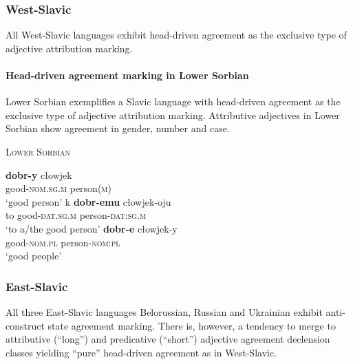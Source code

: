 \subsubsection{West-Slavic}
All West-Slavic languages exhibit head-driven agreement as the exclusive type of adjective attribution marking.
\paragraph{Head-driven agreement marking in Lower Sorbian}
Lower Sorbian exemplifies a Slavic language with head-driven agreement as the exclusive type of adjective attribution marking. Attributive adjectives in Lower Sorbian show agreement in gender, number and case. 

\begin{exe}
\ex \textsc{Lower Sorbian} \citep{janas1976}
\begin{xlist}
\ex
\gll	\textbf{dobr-y} cłowjek\\
	good-\textsc{nom.sg.m} person(\textsc{m})\\
\glt	‘good person’
\ex
\gll	k \textbf{dobr-emu} cłowjek-oju\\
	to good-\textsc{dat.sg.m} person-\textsc{dat:sg.m}\\
\glt	‘to a/the good person’
\ex
\gll	\textbf{dobr-e} cłowjek-y\\
	good-\textsc{nom.pl} person-\textsc{nom:pl}\\
\glt	‘good people’
\end{xlist}
\end{exe}

\subsubsection{East-Slavic}
All three East-Slavic languages Belorussian, Russian and Ukrainian exhibit anti-construct state agreement marking. There is, however, a tendency to merge to attributive (“long”) and predicative (“short”) adjective agreement declension classes yielding “pure” head-driven agreement as in West-Slavic.

